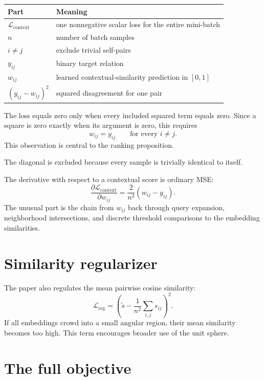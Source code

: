 \documentclass[11pt,oneside,openany]{book}
\theoremstyle{myplain}
\theoremstyle{definition}
\newcommand{\paperEq}[1]{\tag{P#1}}
\begin{document}
\begin{center}
\begin{tabularx}{\textwidth}{>{\bfseries}l X}
\toprule
Part & Meaning \\
\midrule
$\mathcal L_{\mathrm{context}}$ & one nonnegative scalar loss for the entire mini-batch \\
$n$ & number of batch samples \\
$i\ne j$ & exclude trivial self-pairs \\
$y_{ij}$ & binary target relation \\
$w_{ij}$ & learned contextual-similarity prediction in $[0,1]$ \\
$(y_{ij}-w_{ij})^2$ & squared disagreement for one pair \\
\bottomrule
\end{tabularx}
\end{center}

The loss equals zero only when every included squared term equals zero. Since a square is zero exactly when its argument is zero, this requires
\[
  w_{ij}=y_{ij}\qquad\text{for every }i\ne j.
\]
This observation is central to the ranking proposition.

The diagonal is excluded because every sample is trivially identical to itself.

The derivative with respect to a contextual score is ordinary MSE:
\begin{equation}
  \frac{\partial\mathcal L_{\mathrm{context}}}{\partial w_{ij}}
  =\frac{2}{n^2}(w_{ij}-y_{ij}).
  \label{eq:msegrad}
\end{equation}
The unusual part is the chain from $w_{ij}$ back through query expansion, neighborhood intersections, and discrete threshold comparisons to the embedding similarities.

\section{Similarity regularizer}

The paper also regulates the mean pairwise cosine similarity:
\begin{equation*}
  \mathcal L_{\mathrm{reg}}
  =\left(\tilde s-\frac{1}{n^2}\sum_{i,j}s_{ij}\right)^2.
\paperEq{7}
\label{eq:lreg}
\end{equation*}
If all embeddings crowd into a small angular region, their mean similarity becomes too high. This term encourages broader use of the unit sphere.

\section{The full objective}
\end{document}
